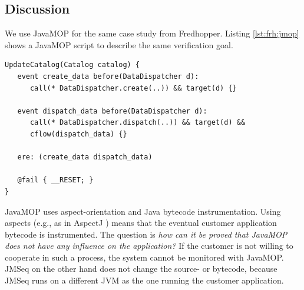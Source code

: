 
\subsection{Discussion} \label{sec:discuss-jmop}

We use JavaMOP \cite{chen_rosu_jmop,chen_rosu_mop,MOP} for the same case study from Fredhopper. 
Listing \ref{lst:frh:jmop} shows a JavaMOP script to describe the same verification goal.

\begin{lstlisting}[label=lst:frh:jmop, caption=Fredhopper case study with JavaMOP]
UpdateCatalog(Catalog catalog) {
   event create_data before(DataDispatcher d):
      call(* DataDispatcher.create(..)) && target(d) {}

   event dispatch_data before(DataDispatcher d):
      call(* DataDispatcher.dispatch(..)) && target(d) &&
      cflow(dispatch_data) {}

   ere: (create_data dispatch_data)

   @fail { __RESET; }
}
\end{lstlisting}
JavaMOP uses aspect-orientation and Java bytecode instrumentation.
Using aspects (e.g., as in AspectJ \cite{kiczales_aspectj}) means that the eventual customer application bytecode is instrumented.
The question is \emph{how can it be proved that JavaMOP does not have any influence on the application?}
If the customer is not willing to cooperate in such a process, the system cannot be monitored with JavaMOP.
JMSeq on the other hand does not change the source- or bytecode, because JMSeq runs on a different JVM as the one running the customer application.

